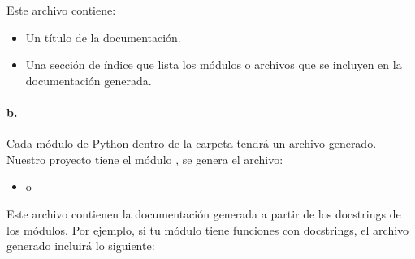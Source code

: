 \documentclass[a4paper,10pt,oneside,spanish,openany]{sphinxmanual}
\begin{document}
\sphinxAtStartPar
Este archivo contiene:
\begin{itemize}
\item {} 
\sphinxAtStartPar
Un título de la documentación.

\item {} 
\sphinxAtStartPar
Una sección de índice que lista los módulos o archivos que se incluyen en la documentación generada.

\end{itemize}


\paragraph{b. }
\label{\detokenize{configuracion_inicial/007.Creacion_de_ficheros_de_codigo_y_generacion_automatica_de_documentacion:b-archivos-rst-o-md-para-cada-modulo-python}}
\sphinxAtStartPar
Cada módulo de Python dentro de la carpeta  tendrá un archivo generado. Nuestro proyecto tiene el módulo
, se genera el archivo:
\begin{itemize}
\item {} 
\sphinxAtStartPar
{} o 

\end{itemize}

\sphinxAtStartPar
Este archivo contienen la documentación generada a partir de los docstrings de los módulos. Por ejemplo, si tu módulo  tiene funciones con docstrings, el archivo generado incluirá lo siguiente:

\begin{sphinxVerbatim}[commandchars=\\\{\}]
\PYGZbs{} 

  


\end{sphinxVerbatim}
\end{document}
